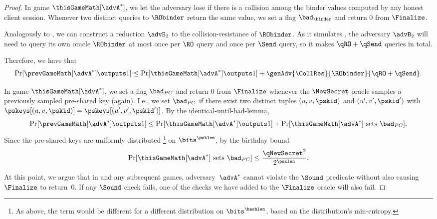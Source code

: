 \begin{proof}
	In game $\thisGameMath[\advA^*]$, we let the adversary lose if there is a collision among the binder values computed by any honest client session.
	Whenever two distinct queries to $\RObinder$ return the same value, we set a flag $\bad_\binder$ and return $0$ from $\Finalize$.
	
	
	Analogously to \prevGameText, we can construct a reduction $\advB_2$ to the collision-resistance of $\RObinder$.
	As it simulates \thisGame, the adversary $\advB_2$ will need to query its own oracle $\RObinder$ at most once per $\RO$ query and once per $\Send$ query, so it makes $\qRO + \qSend$ queries in total.
	
	Therefore, we have that
	\begin{equation}\label{eq:game:binder-coll}
		\Pr[ \prevGameMath[\advA^*] \outputs 1 ] \leq \Pr[ \thisGameMath[\advA^*] \outputs 1 ] + \genAdv{\CollRes}{\RObinder}{\qRO+\qSend} .
	\end{equation}

	In game $\thisGameMath[\advA^*]$, we set a flag $\bad_{PC}$ and return $0$ from $\Finalize$ whenever the $\NewSecret$ oracle samples a previously sampled pre-shared key (again).
	I.e., we set $\bad_{PC}$ if there exist two distinct tuples $(u, v,\pskid)$ and $(u', v',\pskid')$ with $\pskeys[(u, v, \pskid)] = \pskeys[(u',v',\pskid')]$. 
	By the identical-until-bad-lemma,
	\[
		\Pr[ \prevGameMath[\advA^*] \outputs 1 ] \leq \Pr[ \thisGameMath[\advA^*] \outputs 1 ] + \Pr[\thisGameMath[\advA^\ast] \text{ sets }\bad_{PC}] .	
	\]
	Since the pre-shared keys are uniformly distributed%
	\footnote{As above, the term would be different for a different distribution on $\bits^\hashlen$, based on the distribution's min-entropy.}
	on $\bits^\psklen$, by the birthday bound
	\[
		\Pr[\thisGameMath[\advA^\ast] \text{ sets } \bad_{PC} ] \leq \frac{\qNewSecret^2}{2^\psklen}. 
	\]

	At this point, we argue that in \thisGame and any subsequent games, adversary~$\advA^*$ cannot violate the $\Sound$ predicate without also causing $\Finalize$ to return~$0$.
	If any $\Sound$ check fails, one of the checks we have added to the $\Finalize$ oracle will also fail.


\end{proof}
